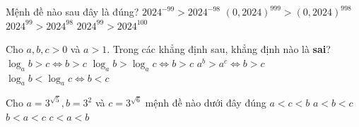 

\begin{ex}%
	Mệnh đề nào sau đây là  đúng?
	\choice 
		 {$2024^{-99}>2024^{-98}$}
		 {$(0,2024)^{999}>(0,2024)^{998}$}
		 {\True $2024^{99}>2024^{98}$}
		{$2024^{99}>2024^{100}$} 
\end{ex}

\begin{ex}%
	Cho $a, b,  c > 0$ và $a > 1$. Trong các khẳng định sau, khẳng định nào là {\bf sai}?
	\choice 
		{\True $\log_a b > c  \Leftrightarrow b > c$}
		{$\log_a  b > \log_a c \Leftrightarrow b > c$}
		{$a^b > a^c \Leftrightarrow b > c$} 
		 {$\log_a b < \log_a c \Leftrightarrow b < c$}
\end{ex}

\begin{ex}%
	Cho $a=3^{\sqrt{5}},b=3^2$ và  $c=3^{\sqrt{6}}$ mệnh đề nào dưới đây đúng
	\choice 
		{$a<c<b$} 
		 {$a<b<c$}
		{\True  $b<a<c$}
		{$c<a<b$} 
\end{ex}

